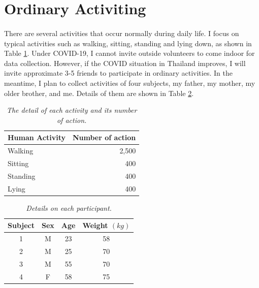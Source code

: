 \section{Ordinary Activiting}
\paragraph{}
There are several activities that occur normally during daily life. I focus on typical activities such as walking, sitting, standing and lying down, as shown in Table \ref{tab:number_action}. Under COVID-19, I cannot invite outside volunteers to come indoor for data collection. However, if the COVID situation in Thailand improves, I will invite approximate 3-5 friends to participate in ordinary activities. In the meantime, I plan to collect activities of four subjects, my father, my mother, my older brother, and me. Details of them are shown in Table \ref{tab:participants}.

\begin{table}[H]
\begin{center}
\caption[The detail of each activity and its number of action.]{\emph{The detail of each activity and its number of action.} \\ \hspace{\textwidth}}\label{tab:number_action}
\begin{tabular}{ l r }
  \textbf{Human Activity} & \textbf{Number of action}\\
\hline
Walking & 2,500 \\
\hline
Sitting & 400 \\
\hline
Standing & 400 \\
\hline
Lying & 400 \\
\hline
   \end{tabular}
\end{center}
 \end{table}
 
\begin{table}[H]
\begin{center}
\caption[Details on each participant.
]{\emph{Details on each participant.} 
\\ \hspace{\textwidth}}\label{tab:participants}
\begin{tabular}{c c c c}
  \textbf{Subject} & \textbf{Sex} &  \textbf{Age} & \textbf{Weight $(kg)$}  \\
\hline

1 & M & 23  & 58 \\
\hline

2 & M & 25  & 70 \\
\hline

3 & M & 55  & 70 \\
\hline

4 & F & 58  & 75 \\
\hline

   \end{tabular}
\end{center}
 \end{table}
  
